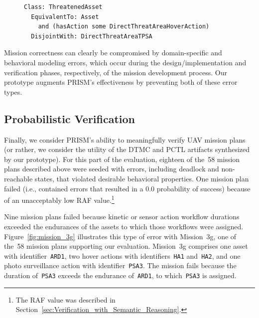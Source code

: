 \begin{figure}[ht]
\begin{lstlisting}[caption={OWL code for class \texttt{ThreatenedAsset}},label=lst:OWL_class_ThreatenedAsset]
Class: ThreatenedAsset
  EquivalentTo: Asset
    and (hasAction some DirectThreatAreaHoverAction)
  DisjointWith: DirectThreatAreaTPSA
\end{lstlisting}
\end{figure}

Mission correctness can clearly be compromised by domain-specific and behavioral modeling errors, which occur during the design/implementation and verification phases, respectively, of the mission development process. Our prototype augments PRISM's effectiveness by preventing both of these error types.

\subsection{Probabilistic Verification}

Finally, we consider PRISM's ability to meaningfully verify UAV mission plans (or rather, we consider the utility of the DTMC and PCTL artifacts synthesized by our prototype). For this part of the evaluation, eighteen of the~58 mission plans described above were seeded with errors, including deadlock and non-reachable states, that violated desirable behavioral properties. One mission plan failed (i.e., contained errors that resulted in a 0.0 probability of success) because of an unacceptably low RAF value.\footnote{The RAF value was described in Section~\ref{sec:Verification_with_Semantic_Reasoning}.}

Nine mission plans failed because kinetic or sensor action workflow durations exceeded the endurances of the assets to which those workflows were assigned. Figure~\ref{fig:mission_3g} illustrates this type of error with Mission~3g, one of the~58 mission plans supporting our evaluation. Mission~3g comprises one asset with identifier~\texttt{ARD1}, two hover actions with identifiers~\texttt{HA1} and~\texttt{HA2}, and one photo surveillance action with identifier~\texttt{PSA3}. The mission fails because the duration of~\texttt{PSA3} exceeds the endurance of~\texttt{ARD1}, to which~\texttt{PSA3} is assigned.

